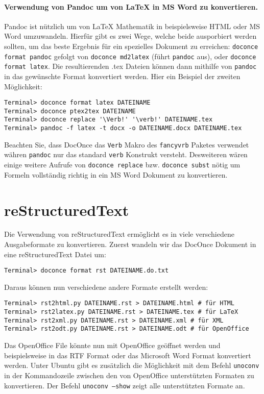\documentclass[%
oneside,                 %
final,                   %
chapterprefix=true,      %
open=right,              %
10pt]{book}
\begin{document}
\paragraph{ Verwendung von Pandoc um von {\LaTeX} in MS Word zu konvertieren.}
Pandoc ist nützlich um von {\LaTeX} Mathematik in beispielsweise HTML oder MS Word umzuwandeln. Hierfür gibt es zwei Wege, welche beide ausporbiert werden sollten, um das beste Ergebnis für ein spezielles Dokument zu erreichen: \texttt{doconce format pandoc} gefolgt von \texttt{doconce md2latex} (führt \texttt{pandoc} aus), oder \texttt{doconce format latex}. Die resultierenden .tex Dateien können dann mithilfe von \texttt{pandoc} in das gewünschte Format konvertiert werden. Hier ein Beispiel der zweiten Möglichkeit:
\begin{verbatim}
Terminal> doconce format latex DATEINAME
Terminal> doconce ptex2tex DATEINAME
Terminal> doconce replace '\Verb!' '\verb!' DATEINAME.tex
Terminal> pandoc -f latex -t docx -o DATEINAME.docx DATEINAME.tex
\end{verbatim}
Beachten Sie, dass DocOnce das \texttt{Verb} Makro des \texttt{fancyvrb} Paketes verwendet währen \texttt{pandoc} nur das standard \texttt{verb} Konstrukt versteht. Desweiteren wären einige weitere Aufrufe von \texttt{doconce replace} bzw. \texttt{doconce subst} nötig um Formeln vollständig richtig in ein MS Word Dokument zu konvertieren.
\section{reStructuredText}
Die Verwendung von reStructuredText ermöglicht es in viele verschiedene Ausgabeformate zu konvertieren. Zuerst wandeln wir das DocOnce Dokument in eine reStructuredText Datei um:
\begin{verbatim}
Terminal> doconce format rst DATEINAME.do.txt
\end{verbatim}
Daraus können nun verschiedene andere Formate erstellt werden:
\begin{verbatim}
Terminal> rst2html.py DATEINAME.rst > DATEINAME.html # für HTML
Terminal> rst2latex.py DATEINAME.rst > DATEINAME.tex # für LaTeX
Terminal> rst2xml.py DATEINAME.rst > DATEINAME.xml # für XML
Terminal> rst2odt.py DATEINAME.rst > DATEINAME.odt # für OpenOffice
\end{verbatim}
Das OpenOffice File könnte nun mit OpenOffice geöffnet werden und beispielsweise in das RTF Format oder das Microsoft Word Format konvertiert werden.
Unter Ubuntu gibt es zusätzlich die Möglichkeit mit dem Befehl \texttt{unoconv} in der Kommandozeile zwischen den von OpenOffice unterstützten Formaten zu konvertieren. Der Befehl \texttt{unoconv --show} zeigt alle unterstützten Formate an.
\end{document}
